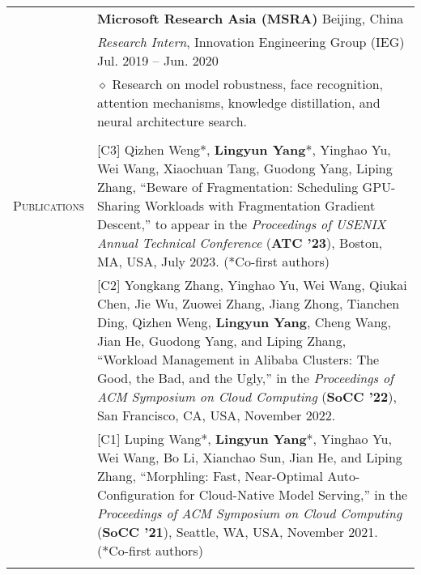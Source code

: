 \documentclass[letterpaper, 11pt]{article}
\begin{document}
\begin{longtable}{p{1in}p{5in}}
& {\textbf{Microsoft Research Asia (MSRA)}} \hfill Beijing, China\\
& \textit{Research Intern}, Innovation Engineering Group (IEG) \hfill Jul. 2019 -- Jun. 2020 \\
& $\diamond$ Research on model robustness, face recognition, attention mechanisms, knowledge distillation, and neural architecture search. \\
& \\

\nohyphens{\textsc{Publications}}

& [C3] Qizhen Weng*, \textbf{Lingyun Yang}*, Yinghao Yu, Wei Wang, Xiaochuan Tang, Guodong Yang, Liping Zhang, “Beware of Fragmentation: Scheduling GPU-Sharing Workloads with Fragmentation Gradient Descent,” to appear in the \textit{Proceedings of USENIX Annual Technical Conference} (\textbf{ATC '23}), Boston, MA, USA, July 2023. (*Co-first authors) \\
& [C2] Yongkang Zhang, Yinghao Yu, Wei Wang, Qiukai Chen, Jie Wu, Zuowei Zhang, Jiang Zhong, Tianchen Ding, Qizhen Weng, \textbf{Lingyun Yang}, Cheng Wang, Jian He, Guodong Yang, and Liping Zhang, “Workload Management in Alibaba Clusters: The Good, the Bad, and the Ugly,” in the \textit{Proceedings of ACM Symposium on Cloud Computing} (\textbf{SoCC '22}), San Francisco, CA, USA, November 2022. \\
& [C1] Luping Wang*, \textbf{Lingyun Yang}*, Yinghao Yu, Wei Wang, Bo Li, Xianchao Sun, Jian He, and Liping Zhang, “Morphling: Fast, Near-Optimal Auto-Configuration for Cloud-Native Model Serving,” in the \textit{Proceedings of ACM Symposium on Cloud Computing} (\textbf{SoCC '21}), Seattle, WA, USA, November 2021. (*Co-first authors) \\
& \\


\end{longtable}
\end{document}
